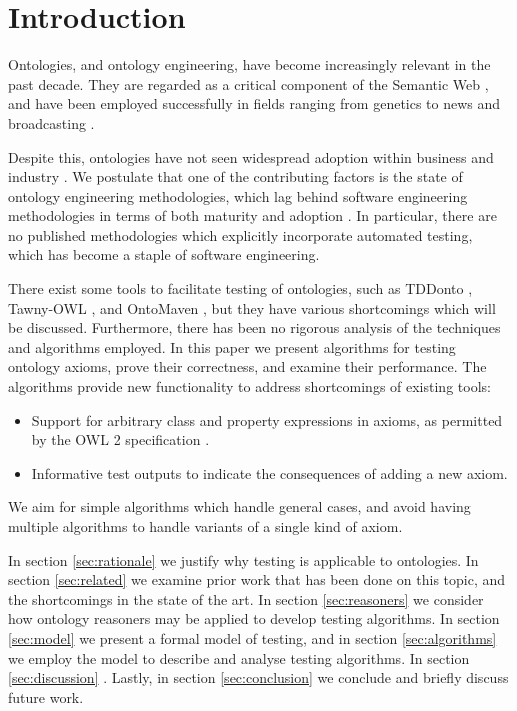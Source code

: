 \documentclass[paper.tex]{subfiles}
\begin{document}
\section{Introduction}
\label{sec:intro}

Ontologies, and ontology engineering, have become increasingly relevant in the past decade.
They are regarded as a critical component of the Semantic Web \cite{BernersLee:SemanticWeb}, and have been employed successfully in fields ranging from genetics \cite{GeneOntology:GoingForward} to news and broadcasting \cite{BBC:LinkedData}.

Despite this, ontologies have not seen widespread adoption within business and industry \cite{Cardoso:SemanticWebVision, Kaczmarek:EnterpriseModelling}.
We postulate that one of the contributing factors is the state of ontology engineering methodologies, which lag behind software engineering methodologies in terms of both maturity and adoption \cite{Iqbal:Methodologies, Simperl:Maturity}.
In particular, there are no published methodologies which explicitly incorporate automated testing, which has become a staple of software engineering.

There exist some tools to facilitate testing of ontologies, such as TDDonto \cite{Lawrynowicz:TDDontoTool}, Tawny-OWL \cite{Warrender:HowWhatWhyTest}, and OntoMaven \cite{Paschke:AspectOntoMaven}, but they have various shortcomings which will be discussed.
Furthermore, there has been no rigorous analysis of the techniques and algorithms employed.
In this paper we present algorithms for testing ontology axioms, prove their correctness, and \todo[TBC] examine their performance.
The algorithms provide new functionality to address shortcomings of existing tools:
\begin{itemize}[nosep]
  \item Support for arbitrary class and property expressions in axioms, as permitted by the OWL 2 specification \cite{W3C:OWL2Syntax}.
  \item Informative test outputs to indicate the consequences of adding a new axiom.
\end{itemize}
We aim for simple algorithms which handle general cases, and avoid having multiple algorithms to handle variants of a single kind of axiom.



In section \ref{sec:rationale} we justify why testing is applicable to ontologies.
In section \ref{sec:related} we examine prior work that has been done on this topic, and the shortcomings in the state of the art.
In section \ref{sec:reasoners} we consider how ontology reasoners may be applied to develop testing algorithms.
In section \ref{sec:model} we present a formal model of testing, and in section \ref{sec:algorithms} we employ the model to describe and analyse testing algorithms.
In section \ref{sec:discussion} .
Lastly, in section \ref{sec:conclusion} we conclude and briefly discuss future work.
\end{document}
